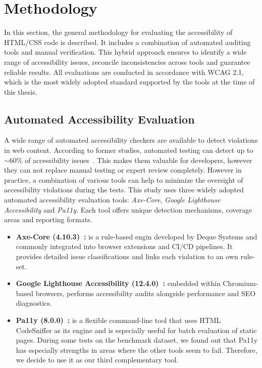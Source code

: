 \chapter{Methodology}
\label{chapter:Methodology}

In this section, the general methodology for evaluating the 
accessibility of HTML/CSS code is described. It includes a combination
of automated auditing tools and manual verification. This hybrid
approach ensures to identify a wide range of accessibility issues,
reconcile inconsistencies across tools and guarantee 
reliable results. All evaluations are conducted in accordance
with WCAG 2.1, which is the most widely adopted standard 
supported by the tools at the time of this thesis.

\section{Automated Accessibility Evaluation}
A wide range of automated accessibility checkers are available to 
detect violations in web content.
According to former studies, automated testing can detect up to $\sim$60\% 
of accessibility issues~\cite{deque2023accessibility}. This makes them 
valuable for developers, however they can not replace manual testing or 
expert review completely.
However in practice, a combination of various tools can help to minimize the 
oversight of accessibility violations during the tests.\newline
This study uses three widely adopted automated accessibility evaluation 
tools: \textit{Axe-Core}, \textit{Google Lighthouse Accessibility} 
and \textit{Pa11y}. Each tool offers unique detection mechanisms,
coverage areas and reporting formats.
\begin{itemize}
  \item \textbf{Axe-Core (4.10.3)~\cite{web:axecore}:} is a rule-based engin
  developed by Deque Systems and commonly integrated into browser 
  extensions and CI/CD pipelines. It provides detailed issue classifications 
  and links each violation to an own rule-set.
  \item \textbf{Google Lighthouse Accessibility (12.4.0)~\cite{web:lighthouse}:} 
  embedded within Chromium-based browsers, performs accessibility audits
  alongside performance and SEO diagnostics.
  \item \textbf{Pa11y (8.0.0)~\cite{web:pa11y}:} is a flexible command-line tool 
  that uses HTML CodeSniffer as its engine and is especially useful for batch 
  evaluation of static pages. During some tests on the benchmark dataset, we 
  found out that Pa11y has especially strengths in areas where the other tools
  seem to fail. Therefore, we decide to use it as our third complementary tool.
\end{itemize}
 

